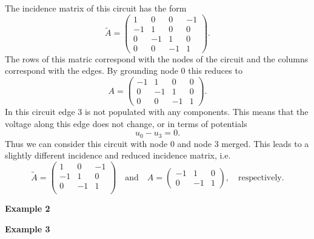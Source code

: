 The incidence matrix of this circuit has the form
\begin{displaymath}
	\tilde{A} = 
	\left(
	\begin{matrix}
		1 & 0 & 0 & -1 \\
		-1 & 1 & 0 & 0 \\
		0 & -1 & 1 & 0 \\
		0 & 0 & -1 & 1 
	\end{matrix}
	\right).
\end{displaymath}
The rows of this matric correspond with the nodes of the circuit and the columns correspond with the edges. By grounding node 0 this reduces to
\begin{displaymath}
	A = 
	\left(
	\begin{matrix}
		-1 & 1 & 0 & 0 \\
		0 & -1 & 1 & 0 \\
		0 & 0 & -1 & 1 
	\end{matrix}
	\right).
\end{displaymath}
In this circuit edge 3 is not populated with any components. This means that the voltage along this edge does not change, or in terms of potentials
\begin{displaymath}
	u_0 - u_3 = 0.
\end{displaymath}
Thus we can consider this circuit with node 0 and node 3 merged. This leads to a slightly different incidence and reduced incidence matrix, i.e.
\begin{displaymath}
	\tilde{A} = 
	\left(
	\begin{matrix}
		1 & 0 & -1 \\
		-1 & 1 & 0 \\
		0 & -1 & 1 \\
	\end{matrix}
	\right) \quad \text{and} \quad
	A = 
	\left(
	\begin{matrix}
		-1 & 1 & 0 \\
		0 & -1 & 1 
	\end{matrix}
	\right), \quad \text{respectively.}
\end{displaymath}


\textbf{Example 2}

\textbf{Example 3}

